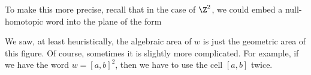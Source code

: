\documentclass[a4paper]{article}
\DeclareMathOperator\Area{Area}
\begin{document}
To make this more precise, recall that in the case of $\Z^2$, we could embed a null-homotopic word into the plane of the form
\begin{center}
\end{center}
We saw, at least heuristically, the algebraic area of $w$ is just the geometric area of this figure. Of course, sometimes it is slightly more complicated. For example, if we have the word $w = [a, b]^2$, then we have to use the cell $[a, b]$ twice.
%
%
%
%
%
%
%
%
%
%
%
\end{document}
